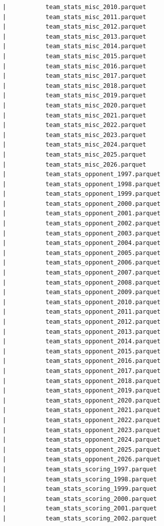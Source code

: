 \begin{lstlisting}
      |           team_stats_misc_2010.parquet
      |           team_stats_misc_2011.parquet
      |           team_stats_misc_2012.parquet
      |           team_stats_misc_2013.parquet
      |           team_stats_misc_2014.parquet
      |           team_stats_misc_2015.parquet
      |           team_stats_misc_2016.parquet
      |           team_stats_misc_2017.parquet
      |           team_stats_misc_2018.parquet
      |           team_stats_misc_2019.parquet
      |           team_stats_misc_2020.parquet
      |           team_stats_misc_2021.parquet
      |           team_stats_misc_2022.parquet
      |           team_stats_misc_2023.parquet
      |           team_stats_misc_2024.parquet
      |           team_stats_misc_2025.parquet
      |           team_stats_misc_2026.parquet
      |           team_stats_opponent_1997.parquet
      |           team_stats_opponent_1998.parquet
      |           team_stats_opponent_1999.parquet
      |           team_stats_opponent_2000.parquet
      |           team_stats_opponent_2001.parquet
      |           team_stats_opponent_2002.parquet
      |           team_stats_opponent_2003.parquet
      |           team_stats_opponent_2004.parquet
      |           team_stats_opponent_2005.parquet
      |           team_stats_opponent_2006.parquet
      |           team_stats_opponent_2007.parquet
      |           team_stats_opponent_2008.parquet
      |           team_stats_opponent_2009.parquet
      |           team_stats_opponent_2010.parquet
      |           team_stats_opponent_2011.parquet
      |           team_stats_opponent_2012.parquet
      |           team_stats_opponent_2013.parquet
      |           team_stats_opponent_2014.parquet
      |           team_stats_opponent_2015.parquet
      |           team_stats_opponent_2016.parquet
      |           team_stats_opponent_2017.parquet
      |           team_stats_opponent_2018.parquet
      |           team_stats_opponent_2019.parquet
      |           team_stats_opponent_2020.parquet
      |           team_stats_opponent_2021.parquet
      |           team_stats_opponent_2022.parquet
      |           team_stats_opponent_2023.parquet
      |           team_stats_opponent_2024.parquet
      |           team_stats_opponent_2025.parquet
      |           team_stats_opponent_2026.parquet
      |           team_stats_scoring_1997.parquet
      |           team_stats_scoring_1998.parquet
      |           team_stats_scoring_1999.parquet
      |           team_stats_scoring_2000.parquet
      |           team_stats_scoring_2001.parquet
      |           team_stats_scoring_2002.parquet

\end{lstlisting}
